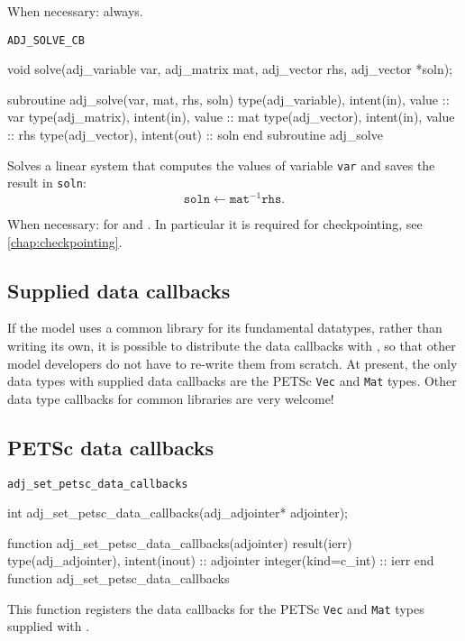 When necessary: always.
\begin{boxwithtitle}{\texttt{ADJ_SOLVE_CB}}
\begin{minipage}{\columnwidth}
\begin{ccode}
  void solve(adj_variable var, adj_matrix mat, adj_vector rhs, adj_vector *soln);
\end{ccode}
\begin{fortrancode}
  subroutine adj_solve(var, mat, rhs, soln) 
    type(adj_variable), intent(in), value :: var
    type(adj_matrix), intent(in), value :: mat
    type(adj_vector), intent(in), value :: rhs
    type(adj_vector), intent(out) :: soln
  end subroutine adj_solve
\end{fortrancode}
\end{minipage}
\end{boxwithtitle}
Solves a linear system that computes the values of variable \texttt{var} and saves the result in \texttt{soln}:
\begin{equation}
\texttt{soln} \leftarrow \texttt{mat}^{-1}\texttt{rhs}.
\end{equation}

When necessary: for  and . In particular it is required for checkpointing, see \autoref{chap:checkpointing}.
\subsection{Supplied data callbacks}
If the model uses a common library for its fundamental datatypes, rather than
writing its own, it is possible to distribute the data callbacks with \libadjoint,
so that other model developers do not have to re-write them from scratch. At present, the
only data types with supplied data callbacks are the PETSc \texttt{Vec} and \texttt{Mat} types.
Other data type callbacks for common libraries are very welcome!

\subsection{PETSc data callbacks} \label{sec:petsc_callbacks}
\begin{boxwithtitle}{\texttt{adj_set_petsc_data_callbacks}}
\begin{minipage}{\columnwidth}
\begin{ccode}
  int adj_set_petsc_data_callbacks(adj_adjointer* adjointer);
\end{ccode}
\begin{fortrancode}
  function adj_set_petsc_data_callbacks(adjointer) result(ierr)
    type(adj_adjointer), intent(inout) :: adjointer
    integer(kind=c_int) :: ierr
  end function adj_set_petsc_data_callbacks
\end{fortrancode}
\end{minipage}
\end{boxwithtitle}
This function registers the data callbacks for the PETSc \texttt{Vec} and \texttt{Mat} types
supplied with \libadjoint.

